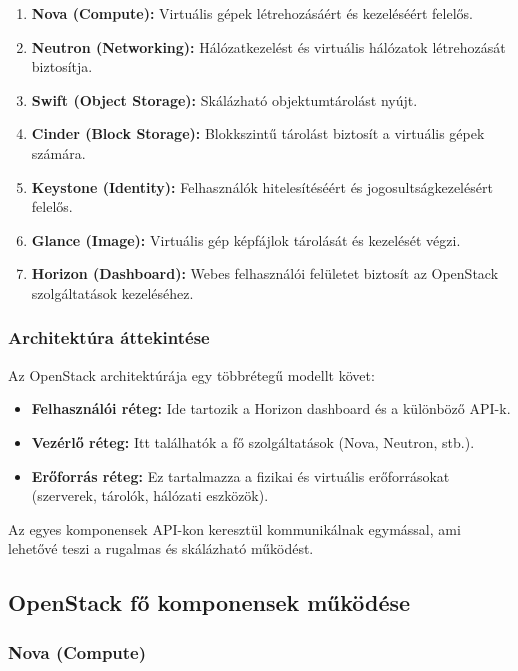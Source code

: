 \documentclass[a4paper,12pt]{article}
\begin{document}
    \begin{enumerate}
        \item \textbf{Nova (Compute):} Virtuális gépek létrehozásáért és kezeléséért felelős.
        \item \textbf{Neutron (Networking):} Hálózatkezelést és virtuális hálózatok létrehozását biztosítja.
        \item \textbf{Swift (Object Storage):} Skálázható objektumtárolást nyújt.
        \item \textbf{Cinder (Block Storage):} Blokkszintű tárolást biztosít a virtuális gépek számára.
        \item \textbf{Keystone (Identity):} Felhasználók hitelesítéséért és jogosultságkezelésért felelős.
        \item \textbf{Glance (Image):} Virtuális gép képfájlok tárolását és kezelését végzi.
        \item \textbf{Horizon (Dashboard):} Webes felhasználói felületet biztosít az OpenStack szolgáltatások kezeléséhez.
    \end{enumerate}

    \subsubsection{Architektúra áttekintése}

    Az OpenStack architektúrája egy többrétegű modellt követ:

    \begin{itemize}
        \item \textbf{Felhasználói réteg:} Ide tartozik a Horizon dashboard és a különböző API-k.
        \item \textbf{Vezérlő réteg:} Itt találhatók a fő szolgáltatások (Nova, Neutron, stb.).
        \item \textbf{Erőforrás réteg:} Ez tartalmazza a fizikai és virtuális erőforrásokat (szerverek, tárolók, hálózati eszközök).
    \end{itemize}

    Az egyes komponensek API-kon keresztül kommunikálnak egymással, ami lehetővé teszi a rugalmas és skálázható működést.

    \subsection{OpenStack fő komponensek működése}

    \subsubsection{Nova (Compute)}
\end{document}
